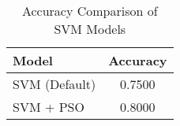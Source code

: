 \begin{table}[ht]
\centering
\caption{Accuracy Comparison of SVM Models}
\begin{tabular}{l|c}
\toprule
Model & Accuracy \\
\midrule
SVM (Default) & 0.7500 \\
SVM + PSO & 0.8000 \\
\bottomrule
\end{tabular}
\end{table}
